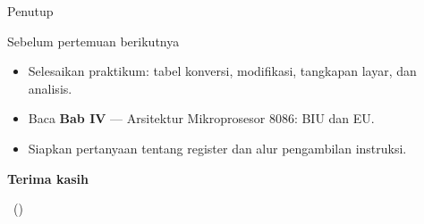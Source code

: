 \documentclass[aspectratio=169,11pt]{beamer}
\begin{document}
\begin{frame}{Penutup}
\begin{block}{Sebelum pertemuan berikutnya}
\small
\begin{itemize}
    \item Selesaikan praktikum: tabel konversi, 
          modifikasi, tangkapan layar, dan analisis.
    \item Baca \textbf{Bab IV} — Arsitektur Mikroprosesor 8086:
          BIU dan EU.
    \item Siapkan pertanyaan tentang register dan alur pengambilan
          instruksi.
\end{itemize}
\end{block}

\vspace{0.4em}
\begin{center}
{\color{obeBlue}\sffamily\large\bfseries Terima kasih\par}
\vspace{0.15em}
{\color{obeGray}\sffamily\small \NamaMK\ (\KodeMK)
\textbullet\ \SemesterTeks\par}
\end{center}
\end{frame}
\end{document}
